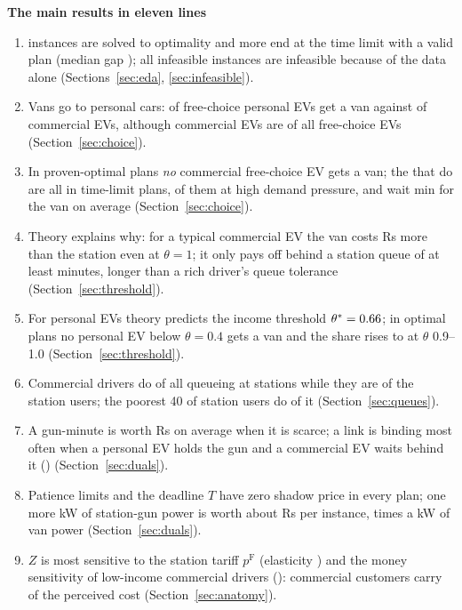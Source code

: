 \begin{keyboxb}
{\color{headblue}\textbf{The main results in eleven lines}}
\begin{enumerate}[leftmargin=1.4em,itemsep=1pt]
  \item \NOpt{} instances are solved to optimality and \NTL{} more end at the time limit with a valid plan (median gap \GapMed\pct); all \NInf{} infeasible instances are infeasible because of the data alone (Sections~\ref{sec:eda}, \ref{sec:infeasible}).
  \item Vans go to personal cars: \VanSharePersonal\pct{} of free-choice personal EVs get a van against \VanShareCommercial\pct{} of commercial EVs, although commercial EVs are \CommShareFree\pct{} of all free-choice EVs (Section~\ref{sec:choice}).
  \item In proven-optimal plans \emph{no} commercial free-choice EV gets a van; the \NFreeVanCommercial{} that do are all in time-limit plans, \CommVanHighPressPct\pct{} of them at high demand pressure, and wait \CommVanWait{} min for the van on average (Section~\ref{sec:choice}).
  \item Theory explains why: for a typical commercial EV the van costs \DeltaCOne{} Rs more than the station even at $\theta=1$; it only pays off behind a station queue of at least \QNeededOne{} minutes, longer than a rich driver's queue tolerance (Section~\ref{sec:threshold}).
  \item For personal EVs theory predicts the income threshold $\theta^{*}=0.66$; in optimal plans no personal EV below $\theta=0.4$ gets a van and the share rises to \VanPersNineTen\pct{} at $\theta$ 0.9--1.0 (Section~\ref{sec:threshold}).
  \item Commercial drivers do \QShareComm\pct{} of all queueing at stations while they are \UserShareComm\pct{} of the station users; the poorest 40\pct{} of station users do \QShareBottom\pct{} of it (Section~\ref{sec:queues}).
  \item A gun-minute is worth \GunMean{} Rs on average when it is scarce; a link is binding most often when a personal EV holds the gun and a commercial EV waits behind it (\GunBindPersOnCommBehind\pct) (Section~\ref{sec:duals}).
  \item Patience limits and the deadline $T$ have zero shadow price in every plan; one more kW of station-gun power is worth about \DPFmean{} Rs per instance, \DPFoverDPM{} times a kW of van power (Section~\ref{sec:duals}).
  \item $Z$ is most sensitive to the station tariff $p^{\mathrm F}$ (elasticity \ElPF\pct) and the money sensitivity of low-income commercial drivers (\ElTopTwo\pct): commercial customers carry \CustShareComm\pct{} of the perceived cost (Section~\ref{sec:anatomy}).

\end{enumerate}
\end{keyboxb}
